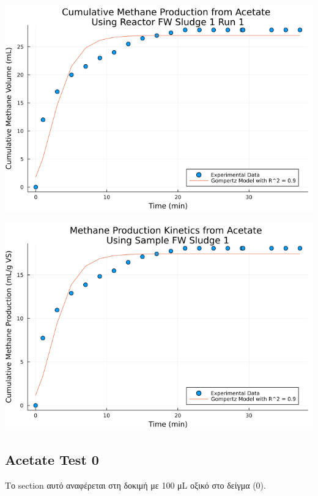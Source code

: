 \documentclass[11pt]{article}
\begin{document}
\begin{center}
\includegraphics[width=.9\linewidth]{../plots/BMPs/Acetate/methane_kinetics_acet_test_fw_s1_min.png}
\end{center}

\begin{center}
\includegraphics[width=.9\linewidth]{../plots/BMPs/Acetate/specific_methane_kinetics_acet_test_fw_s1.png}
\end{center}

\subsection{Acetate Test 0}
\label{sec:org964a24a}
Το section αυτό αναφέρεται στη δοκιμή με 100 μL οξικό στο δείγμα (0).
\end{document}
